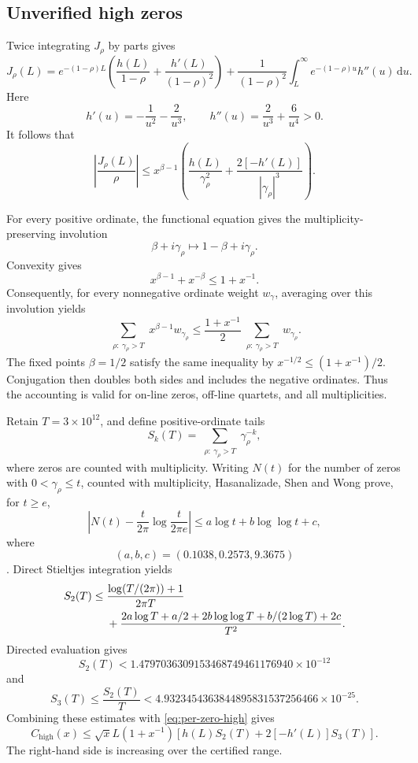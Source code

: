 \documentclass[11pt,a4paper]{article}
\numberwithin{equation}{section}
\theoremstyle{definition}
\newcommand{\dd}{\,\mathrm{d}}
\begin{document}
\subsection{Unverified high zeros}

Twice integrating \(J_\rho\) by parts gives
\[
  J_\rho(L)
  =
  e^{-(1-\rho)L}
  \left(
  \frac{h(L)}{1-\rho}
  +\frac{h'(L)}{(1-\rho)^2}
  \right)
  +
  \frac1{(1-\rho)^2}
  \int_L^\infty e^{-(1-\rho)u}h''(u)\dd u.
\]
Here
\[
  h'(u)=-\frac1{u^2}-\frac2{u^3},
  \qquad
  h''(u)=\frac2{u^3}+\frac6{u^4}>0.
\]
It follows that
\begin{equation}\label{eq:per-zero-high}
  \left|\frac{J_\rho(L)}{\rho}\right|
  \le
  x^{\beta-1}
  \left(
  \frac{h(L)}{\gamma_\rho^2}
  +\frac{2[-h'(L)]}{|\gamma_\rho|^3}
  \right).
\end{equation}

For every positive ordinate, the functional equation gives the
multiplicity-preserving involution
\[
  \beta+i\gamma_\rho
  \longmapsto
  1-\beta+i\gamma_\rho.
\]
Convexity gives
\[
  x^{\beta-1}+x^{-\beta}\le1+x^{-1}.
\]
Consequently, for every nonnegative ordinate weight \(w_\gamma\), averaging
over this involution yields
\[
  \sum_{\substack{\rho:\ \gamma_\rho>T}}
  x^{\beta-1}w_{\gamma_\rho}
  \le
  \frac{1+x^{-1}}2
  \sum_{\substack{\rho:\ \gamma_\rho>T}}w_{\gamma_\rho}.
\]
The fixed points \(\beta=1/2\) satisfy the same inequality by
\(x^{-1/2}\le(1+x^{-1})/2\).  Conjugation then doubles both sides and includes
the negative ordinates.  Thus the accounting is valid for on-line zeros,
off-line quartets, and all multiplicities.

Retain \(T=3\times10^{12}\), and define positive-ordinate tails
\[
  S_k(T)=\sum_{\substack{\rho:\ \gamma_\rho>T}}\gamma_\rho^{-k},
\]
where zeros are counted with multiplicity.
Writing \(N(t)\) for the number of zeros with
\(0<\gamma_\rho\le t\), counted with multiplicity, Hasanalizade, Shen and
Wong prove, for \(t\ge e\),
\[
  \left|
  N(t)-\frac{t}{2\pi}\log\frac{t}{2\pi e}
  \right|
  \le
  a\log t+b\log\log t+c,
\]
where
\[
  (a,b,c)=(0.1038,0.2573,9.3675)
\]
\cite{hsw2022}.  Direct Stieltjes integration yields
\begin{align}
  S_2(T)
  \le{}&
  \frac{\log(T/(2\pi))+1}{2\pi T}\notag\\
  &+
  \frac{
  2a\log T+a/2+2b\log\log T+b/(2\log T)+2c
  }{T^2}.
  \label{eq:S2-tail}
\end{align}
Directed evaluation gives
\[
  S_2(T)
  <
  1.4797036309153468749461176940\times10^{-12}
\]
and
\[
  S_3(T)\le\frac{S_2(T)}T
  <
  4.9323454363844895831537256466\times10^{-25}.
\]
Combining these estimates with \eqref{eq:per-zero-high} gives
\begin{equation}\label{eq:high-zero-loss}
  C_{\mathrm{high}}(x)
  \le
  \sqrt{x}L(1+x^{-1})
  \left[
  h(L)S_2(T)+2[-h'(L)]S_3(T)
  \right].
\end{equation}
The right-hand side is increasing over the certified range.
\end{document}
